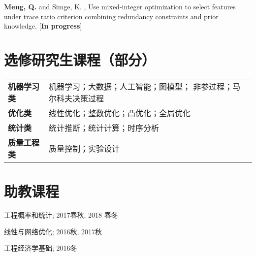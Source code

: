 \documentclass[margin,line,11pt]{resume}
\begin{document}
\begin{resume}
        \vspace{-0.5em}
        
       \textbf{Meng, Q.} and Simge, K. , Use mixed-integer optimization to select features under trace ratio criterion combining redundancy constraints and prior knowledge. [\textbf{In progress}]
        
                \vspace{-0.5em}\section{\mysidestyle 选修研究生课程（部分）}
\vspace{0.5em}
	\begin{tabular}{ll }
          \textbf{机器学习类} & 机器学习；大数据；人工智能；图模型；
非参过程；马尔科夫决策过程\\
  \textbf{优化类} & 线性优化；整数优化；凸优化；全局优化\\
   \textbf{统计类}& 统计推断；统计计算；时序分析\\
\textbf{质量工程类} & 质量控制；实验设计 \\
	\end{tabular}

 


                \vspace{-0.5em}\section{\mysidestyle 助教课程}
        \begin{list2}
        \item   工程概率和统计;  2017春秋, 2018 春冬
        \item   线性与网络优化; 2016秋, 2017秋
        \item  工程经济学基础;  2016冬
        \end{list2}
        

\end{resume}
\end{document}
